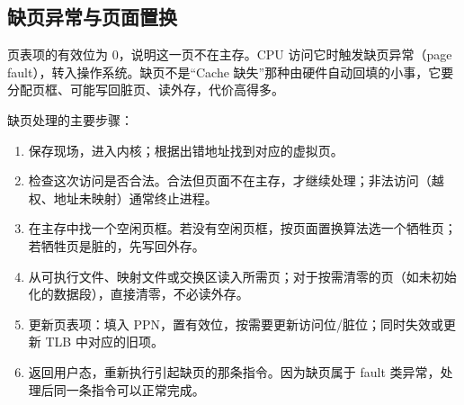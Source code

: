 \subsection{缺页异常与页面置换}

页表项的有效位为 0，说明这一页不在主存。CPU 访问它时触发缺页异常（page fault），转入操作系统。缺页不是“Cache 缺失”那种由硬件自动回填的小事，它要分配页框、可能写回脏页、读外存，代价高得多。

缺页处理的主要步骤：

\begin{enumerate}
    \item 保存现场，进入内核；根据出错地址找到对应的虚拟页。
    \item 检查这次访问是否合法。合法但页面不在主存，才继续处理；非法访问（越权、地址未映射）通常终止进程。
    \item 在主存中找一个空闲页框。若没有空闲页框，按页面置换算法选一个牺牲页；若牺牲页是脏的，先写回外存。
    \item 从可执行文件、映射文件或交换区读入所需页；对于按需清零的页（如未初始化的数据段），直接清零，不必读外存。
    \item 更新页表项：填入 PPN，置有效位，按需要更新访问位/脏位；同时失效或更新 TLB 中对应的旧项。
    \item 返回用户态，重新执行引起缺页的那条指令。因为缺页属于 fault 类异常，处理后同一条指令可以正常完成。
\end{enumerate}

